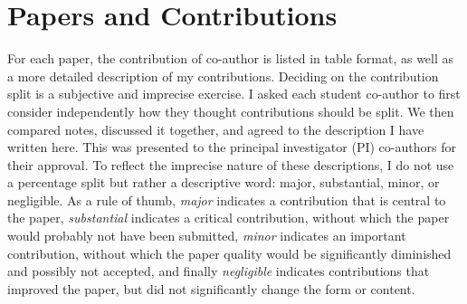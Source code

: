\section{Papers and Contributions}
For each paper, the contribution of co-author is listed in table format, as well as a more detailed description of my contributions. Deciding on the contribution split is a subjective and imprecise exercise. I asked each student co-author to first consider independently how they thought contributions should be split. We then compared notes, discussed it together, and agreed to the description I have written here. This was presented to the principal investigator (PI) co-authors for their approval. To reflect the imprecise nature of these descriptions, I do not use a percentage split but rather a descriptive word: major, substantial, minor, or negligible. As a rule of thumb, \emph{major} indicates a contribution that is central to the paper, \emph{substantial} indicates a critical contribution, without which the paper would probably not have been submitted, \emph{minor} indicates an important contribution, without which the paper quality would be significantly diminished and possibly not accepted, and finally \emph{negligible} indicates contributions that improved the paper, but did not significantly change the form or content.

